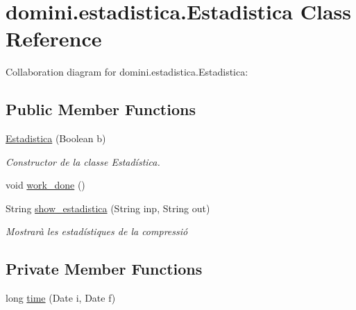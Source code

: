 \hypertarget{classdomini_1_1estadistica_1_1Estadistica}{}\section{domini.\+estadistica.\+Estadistica Class Reference}
\label{classdomini_1_1estadistica_1_1Estadistica}


Collaboration diagram for domini.\+estadistica.\+Estadistica\+:
\subsection*{Public Member Functions}
\begin{DoxyCompactItemize}
\item 
\hyperlink{classdomini_1_1estadistica_1_1Estadistica_aab5e956c9a7e31945ddf93cb4f332746}{Estadistica} (Boolean b)
\begin{DoxyCompactList}\small\item\em Constructor de la classe Estadística. \end{DoxyCompactList}\item 
void \hyperlink{classdomini_1_1estadistica_1_1Estadistica_a2fb112c0f85d0a831b858a994731497c}{work\+\_\+done} ()
\item 
String \hyperlink{classdomini_1_1estadistica_1_1Estadistica_a6cac6971be817fd985afb8f3b6725464}{show\+\_\+estadistica} (String inp, String out)
\begin{DoxyCompactList}\small\item\em Mostrarà les estadístiques de la compressió \end{DoxyCompactList}\end{DoxyCompactItemize}
\subsection*{Private Member Functions}
\begin{DoxyCompactItemize}
\item 
long \hyperlink{classdomini_1_1estadistica_1_1Estadistica_a7587e21e3f7f177afe0dd36483c8fe5d}{time} (Date i, Date f)
\end{DoxyCompactItemize}
